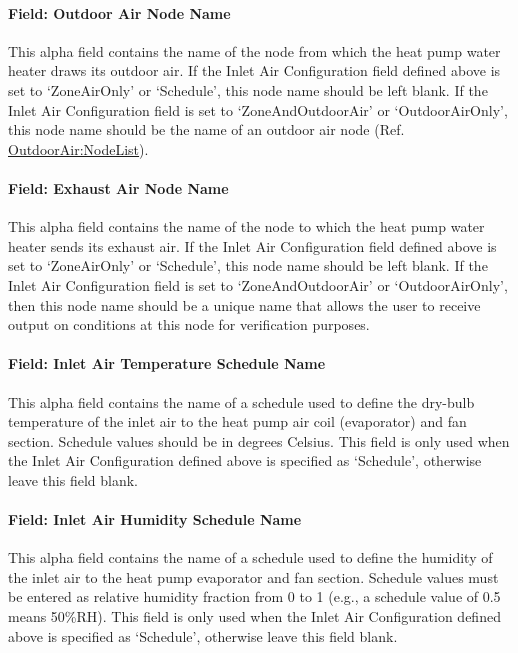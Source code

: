 \paragraph{Field: Outdoor Air Node Name}\label{field-outdoor-air-node-name-1}

This alpha field contains the name of the node from which the heat pump water heater draws its outdoor air. If the Inlet Air Configuration field defined above is set to `ZoneAirOnly' or `Schedule', this node name should be left blank. If the Inlet Air Configuration field is set to `ZoneAndOutdoorAir' or `OutdoorAirOnly', this node name should be the name of an outdoor air node (Ref. \hyperref[outdoorairnodelist]{OutdoorAir:NodeList}).

\paragraph{Field: Exhaust Air Node Name}\label{field-exhaust-air-node-name-1}

This alpha field contains the name of the node to which the heat pump water heater sends its exhaust air. If the Inlet Air Configuration field defined above is set to `ZoneAirOnly' or `Schedule', this node name should be left blank. If the Inlet Air Configuration field is set to `ZoneAndOutdoorAir' or `OutdoorAirOnly', then this node name should be a unique name that allows the user to receive output on conditions at this node for verification purposes.

\paragraph{Field: Inlet Air Temperature Schedule Name}\label{field-inlet-air-temperature-schedule-name-1}

This alpha field contains the name of a schedule used to define the dry-bulb temperature of the inlet air to the heat pump air coil (evaporator) and fan section. Schedule values should be in degrees Celsius. This field is only used when the Inlet Air Configuration defined above is specified as `Schedule', otherwise leave this field blank.

\paragraph{Field: Inlet Air Humidity Schedule Name}\label{field-inlet-air-humidity-schedule-name-1}

This alpha field contains the name of a schedule used to define the humidity of the inlet air to the heat pump evaporator and fan section. Schedule values must be entered as relative humidity fraction from 0 to 1 (e.g., a schedule value of 0.5 means 50\%RH). This field is only used when the Inlet Air Configuration defined above is specified as `Schedule', otherwise leave this field blank.

